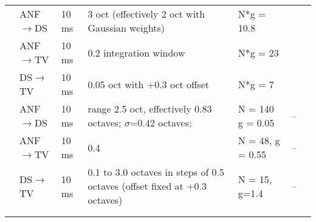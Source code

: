 \begin{longtable}{cXXXXXX}
          {\citealp*{ReissYoung:2005}}            & {ANF\ensuremath{\rightarrow}DS} &    {10 ms}    &                {3 oct (effectively 2 oct with Gaussian weights)}                 & N*g = 10.8                        
                                                  & \\ 
                                                  &  ANF\ensuremath{\rightarrow}TV  &     10 ms     &                          0.2 integration window                           & N*g = 23                      
                                                  & \\ 
                                                  &  DS\ensuremath{\rightarrow}TV   &     10 ms     &                       0.05 oct with +0.3 oct offset                       & N*g = 7                      
                                                  & \\ \midrule
          \citealp*{LomakinDavis:2008}            & {ANF\ensuremath{\rightarrow}DS} &    {10 ms}    &    range 2.5 oct, effectively 0.83 octaves; $\sigma$=0.42 octaves;    & N = 140 g = 0.05                        
                                                  & --\\ 
                                                  &  ANF\ensuremath{\rightarrow}TV  &     10 ms     &                                    0.4                                    & N = 48, g = 0.55                     
                                                  & --\\ 
                                                  &  DS\ensuremath{\rightarrow}TV   &     10 ms     & 0.1 to 3.0 octaves in steps of 0.5 octaves (offset fixed at +0.3 octaves) & N = 15, g=1.4                      
                                                  & --\\ \midrule

\citep{BlumReed:2000,BlumReed:1998,ReedBlum:1997} &                                 &               &                                                                           & 
                                                  & \\ 
     \citep{BlumReedEtAl:1995,ReedBlum:1995}      &                                 &               &                                                                           & 
                                                  & \\ 


\end{longtable}
